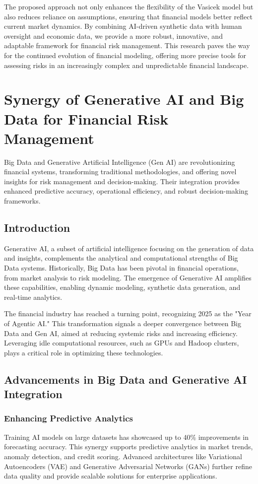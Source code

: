\documentclass[a4paper,headinclude=on,footinclude=on,12pt,oneside]{scrbook}
\begin{document}
The proposed approach not only enhances the flexibility of the Vasicek model but also reduces reliance on assumptions, ensuring that financial models better reflect current market dynamics. By combining AI-driven synthetic data with human oversight and economic data, we provide a more robust, innovative, and adaptable framework for financial risk management. This research paves the way for the continued evolution of financial modeling, offering more precise tools for assessing risks in an increasingly complex and unpredictable financial landscape.


\chapter{Synergy of Generative AI and Big Data for Financial Risk Management}

Big Data and Generative Artificial Intelligence (Gen AI) are revolutionizing financial systems, transforming traditional methodologies, and offering novel insights for risk management and decision-making. Their integration provides enhanced predictive accuracy, operational efficiency, and robust decision-making frameworks.

\section{Introduction}
Generative AI, a subset of artificial intelligence focusing on the generation of data and insights, complements the analytical and computational strengths of Big Data systems. Historically, Big Data has been pivotal in financial operations, from market analysis to risk modeling. The emergence of Generative AI amplifies these capabilities, enabling dynamic modeling, synthetic data generation, and real-time analytics.

The financial industry has reached a turning point, recognizing 2025 as the "Year of Agentic AI." This transformation signals a deeper convergence between Big Data and Gen AI, aimed at reducing systemic risks and increasing efficiency. Leveraging idle computational resources, such as GPUs and Hadoop clusters, plays a critical role in optimizing these technologies.

\section{Advancements in Big Data and Generative AI Integration}

\subsection{Enhancing Predictive Analytics}
Training AI models on large datasets has showcased up to 40\% improvements in forecasting accuracy. This synergy supports predictive analytics in market trends, anomaly detection, and credit scoring. Advanced architectures like Variational Autoencoders (VAE) and Generative Adversarial Networks (GANs) further refine data quality and provide scalable solutions for enterprise applications.
\end{document}
